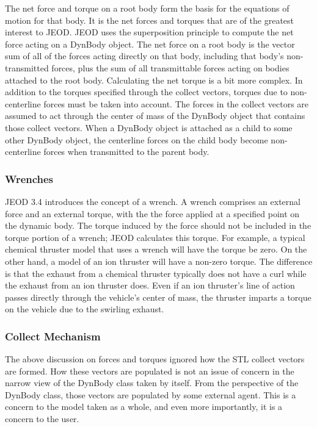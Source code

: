The net force and torque on a root body form the basis for the equations of
motion for that body. It is the net forces and torques that are of the
greatest interest to JEOD. JEOD uses the superposition principle to compute the
net force acting on a DynBody object. The net force on a root body is the
vector sum of all of the forces acting directly on that body, including that
body's non-transmitted forces, plus the sum of all transmittable forces acting
on bodies attached to the root body. Calculating the net torque is a bit more
complex. In addition to the torques specified through the collect vectors,
torques due to non-centerline forces must be taken into account. The
forces in the collect vectors are assumed to act through the center of mass
of the DynBody object that contains those collect vectors. When a DynBody object is
attached as a child to some other DynBody object, the centerline forces on the
child body become non-centerline forces when transmitted to the parent body.

\subsubsection{Wrenches}
JEOD 3.4 introduces the concept of a wrench. A wrench comprises an external force
and an external torque, with the the force applied at a specified point on the
dynamic body. The torque induced by the force should not be included in the
torque portion of a wrench; JEOD calculates this torque. For example, a typical
chemical thruster model that uses a wrench will have the torque be zero.
On the other hand, a model of an ion thruster will have a non-zero torque.
The difference is that the exhaust from a chemical thruster typically does not
have a curl while the exhaust from an ion thruster does. Even if an ion thruster's
line of action passes directly through the vehicle's center of mass, the thruster
imparts a torque on the vehicle due to the swirling exhaust.

\subsubsection{Collect Mechanism}
The above discussion on forces and torques ignored how the STL collect vectors
are formed. How these vectors are populated is not an issue of concern in the
narrow view of the DynBody class taken by itself. From the perspective of the
DynBody class, those vectors are populated by some external agent.
This is a concern to the model taken as a whole, and even more importantly,
it is a concern to the user.

